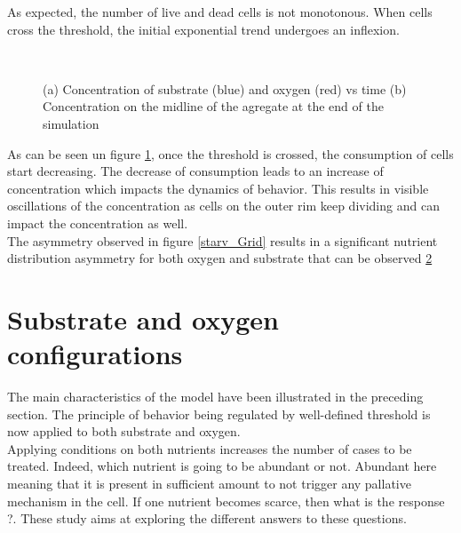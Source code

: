 \documentclass[11pt,a4paper]{article}
\begin{document}
As expected, the number of live and dead cells is not monotonous. When cells cross the threshold, the initial exponential trend undergoes an inflexion.\\

\begin{figure}[ht!]
\begin{subfigure}{0.5\textwidth}
	\centering
	
	\caption{ \label{starv_SO_ctr}}
\end{subfigure}
~~
\begin{subfigure}{0.5\textwidth}
	\centering
	
	\caption{\label{starv_SO_ctrline}}
\end{subfigure}
\caption{(a) Concentration of substrate (blue) and oxygen (red) vs time (b) Concentration on the midline of the agregate at the end of the simulation \label{ref_SO}}
\end{figure}

As can be seen un figure \ref{starv_SO_ctr}, once the threshold is crossed, the consumption of cells start decreasing. The decrease of consumption leads to an increase of concentration which impacts the dynamics of behavior. This results in visible oscillations of the concentration as cells on the outer rim keep dividing and can impact the concentration as well.\\

The asymmetry observed in figure \ref{starv_Grid} results in a significant nutrient distribution asymmetry for both oxygen and substrate that can be observed \ref{starv_SO_ctrline}

\section{Substrate and oxygen configurations}
The main characteristics of the model have been illustrated in the preceding section. The principle of behavior being regulated by well-defined threshold is now applied to both substrate and oxygen.\\

Applying conditions on both nutrients increases the number of cases to be treated. Indeed, which nutrient is going to be abundant or not. Abundant here meaning that it is present in sufficient amount to not trigger any pallative mechanism in the cell. If one nutrient becomes scarce, then what is the response ?. These study aims at exploring the different answers to these questions.\\
\end{document}

